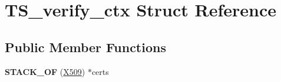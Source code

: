 \hypertarget{struct_t_s__verify__ctx}{}\section{T\+S\+\_\+verify\+\_\+ctx Struct Reference}
\label{struct_t_s__verify__ctx}
\subsection*{Public Member Functions}
\begin{DoxyCompactItemize}
\item 
\mbox{\label{struct_t_s__verify__ctx_a27ea1de4a3594f27c7ac6255091f858f}} 
{\bfseries S\+T\+A\+C\+K\+\_\+\+OF} (\hyperlink{structx509__st}{X509}) $\ast$certs
\end{DoxyCompactItemize}

